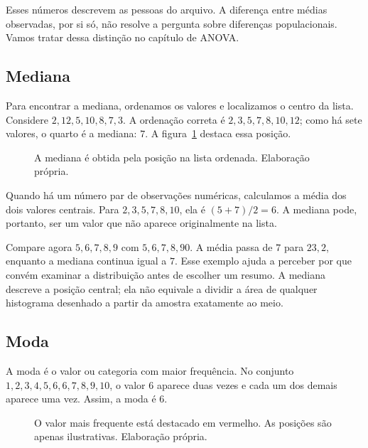 Esses números descrevem as pessoas do arquivo. A diferença entre médias observadas, por si só, não resolve a pergunta sobre diferenças populacionais. Vamos tratar dessa distinção no capítulo de ANOVA.

\subsection{Mediana}

Para encontrar a mediana, ordenamos os valores e localizamos o centro da lista. Considere $2,12,5,10,8,7,3$. A ordenação correta é $2,3,5,7,8,10,12$; como há sete valores, o quarto é a mediana: $7$. A figura~\ref{fig:mediana-ordenada} destaca essa posição.

\begin{figure}[H]
\centering
{}
\caption{A mediana é obtida pela posição na lista ordenada. Elaboração própria.}
\label{fig:mediana-ordenada}
\end{figure}

Quando há um número par de observações numéricas, calculamos a média dos dois valores centrais. Para $2,3,5,7,8,10$, ela é $(5+7)/2=6$. A mediana pode, portanto, ser um valor que não aparece originalmente na lista.

Compare agora $5,6,7,8,9$ com $5,6,7,8,90$. A média passa de $7$ para $23{,}2$, enquanto a mediana continua igual a $7$. Esse exemplo ajuda a perceber por que convém examinar a distribuição antes de escolher um resumo. A mediana descreve a posição central; ela não equivale a dividir a área de qualquer histograma desenhado a partir da amostra exatamente ao meio.

\subsection{Moda}

A moda é o valor ou categoria com maior frequência. No conjunto $1,2,3,4,5,6,6,7,8,9,10$, o valor $6$ aparece duas vezes e cada um dos demais aparece uma vez. Assim, a moda é $6$.

\begin{figure}[H]
\centering
{}
\caption{O valor mais frequente está destacado em vermelho. As posições são apenas ilustrativas. Elaboração própria.}
\label{fig:circulo_moda}
\end{figure}

